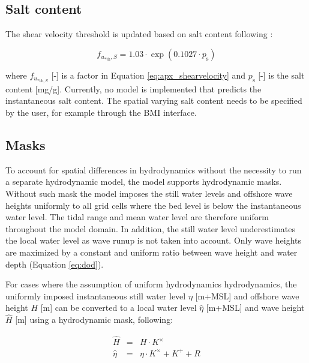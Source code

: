 \subsection{Salt content}

The shear velocity threshold is updated based on salt content
following \citet{Nickling1981}:

\begin{equation}
  f_{u_{\mathrm{* th}},S} = 1.03 \cdot \exp(0.1027 \cdot p_{\mathrm{s}})
\end{equation}

\noindent where $f_{u_{\mathrm{* th},S}}$ [-] is a factor in Equation
\ref{eq:apx_shearvelocity} and $p_{\mathrm{s}}$ [-] is the salt
content [mg/g]. Currently, no model is implemented that predicts the
instantaneous salt content. The spatial varying salt content needs to
be specified by the user, for example through the BMI interface.

\subsection{Masks}
\label{apx:mask}

To account for spatial differences in hydrodynamics without the
necessity to run a separate hydrodynamic model, the model supports
hydrodynamic masks. Without such mask the model imposes the still
water levels and offshore wave heights uniformly to all grid cells
where the bed level is below the instantaneous water level. The tidal
range and mean water level are therefore uniform throughout the model
domain.  In addition, the still water level underestimates the local
water level as wave runup is not taken into account. Only wave
heights are maximized by a constant and uniform ratio between wave
height and water depth (Equation \ref{eq:dod}).

For cases where the assumption of uniform hydrodynamics hydrodynamics,
the uniformly imposed instantaneous still water level $\eta$ [m+MSL]
and offshore wave height $H$ [m] can be converted to a local water
level $\hat{\eta}$ [m+MSL] and wave height $\hat{H}$ [m] using a
hydrodynamic mask, following:

\begin{equation}
  \label{eq:hydromask}
  \begin{array}{rcl}
    \hat{H} &=& H \cdot K^{\mathrm{\times}} \\
    \hat{\eta} &=& \eta \cdot K^{\mathrm{\times}} +  K^{\mathrm{+}} + R \\
  \end{array}
\end{equation}

